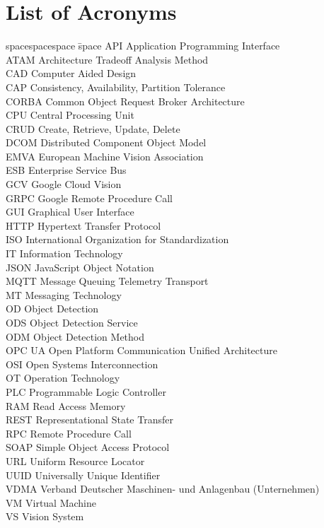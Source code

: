 \chapter*{List of Acronyms}
\thispagestyle{empty}
\begin{tabbing}
spacespacespace \= space \kill
API	 \> 	Application Programming Interface	 \\
ATAM	 \> 	Architecture Tradeoff Analysis Method	 \\
CAD	 \> 	Computer Aided Design	 \\
CAP	 \> 	Consistency, Availability, Partition Tolerance	 \\
CORBA	 \> 	Common Object Request Broker Architecture 	 \\
CPU	 \> 	Central Processing Unit	 \\
CRUD	 \> 	Create, Retrieve, Update, Delete	 \\
DCOM	 \> 	Distributed Component Object Model	 \\
EMVA \> European Machine Vision Association\\
ESB	\>	Enterprise Service Bus \\
GCV	\>	Google Cloud Vision \\
GRPC     \>  Google Remote Procedure Call\\
GUI	\>	Graphical User Interface \\
HTTP	 \> 	Hypertext Transfer Protocol	 \\
ISO    \>  International Organization for Standardization\\
IT  \>  Information Technology\\
JSON	\>	JavaScript Object Notation \\
MQTT     \>  Message Queuing Telemetry Transport\\
MT      \> Messaging Technology\\
OD     \>  Object Detection\\
ODS     \>  Object Detection Service\\
ODM     \>  Object Detection Method\\
OPC UA     \>  Open Platform Communication Unified Architecture\\
OSI     \>  Open Systems Interconnection\\
OT  \> Operation Technology\\
PLC  \> Programmable Logic Controller\\
RAM    \> Read Access Memory \\
REST    \> Representational State Transfer \\
RPC    \> Remote Procedure Call \\
SOAP	 \> 	Simple Object Access Protocol	 \\
URL	 \> 	Uniform Resource Locator	 \\
UUID	 \> 	Universally Unique Identifier	 \\
VDMA \>     Verband Deutscher Maschinen- und Anlagenbau (Unternehmen) \\
VM	 \> 	Virtual Machine	 \\
VS  \>  Vision System\\
\end{tabbing}
\thispagestyle{empty}
\endinput
